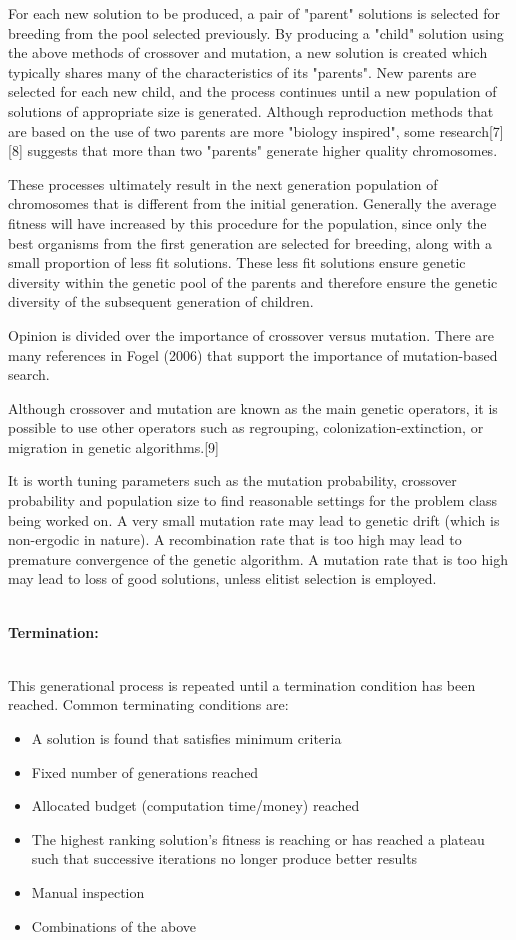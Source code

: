 \documentclass[a4paper, 12pt]{article}
\begin{document}
For each new solution to be produced, a pair of "parent" solutions is selected for breeding from the pool selected previously. By producing a "child" solution using the above methods of crossover and mutation, a new solution is created which typically shares many of the characteristics of its "parents". New parents are selected for each new child, and the process continues until a new population of solutions of appropriate size is generated. Although reproduction methods that are based on the use of two parents are more "biology inspired", some research[7][8] suggests that more than two "parents" generate higher quality chromosomes.

These processes ultimately result in the next generation population of chromosomes that is different from the initial generation. Generally the average fitness will have increased by this procedure for the population, since only the best organisms from the first generation are selected for breeding, along with a small proportion of less fit solutions. These less fit solutions ensure genetic diversity within the genetic pool of the parents and therefore ensure the genetic diversity of the subsequent generation of children.

Opinion is divided over the importance of crossover versus mutation. There are many references in Fogel (2006) that support the importance of mutation-based search.

Although crossover and mutation are known as the main genetic operators, it is possible to use other operators such as regrouping, colonization-extinction, or migration in genetic algorithms.[9]

It is worth tuning parameters such as the mutation probability, crossover probability and population size to find reasonable settings for the problem class being worked on. A very small mutation rate may lead to genetic drift (which is non-ergodic in nature). A recombination rate that is too high may lead to premature convergence of the genetic algorithm. A mutation rate that is too high may lead to loss of good solutions, unless elitist selection is employed.\\~\\
\begin{large}\textbf{Termination:}\end{large}\\
This generational process is repeated until a termination condition has been reached. Common terminating conditions are:
\begin{itemize}
\item A solution is found that satisfies minimum criteria
\item Fixed number of generations reached
\item Allocated budget (computation time/money) reached
\item The highest ranking solution's fitness is reaching or has reached a plateau such that successive iterations no longer produce better results
\item Manual inspection
\item Combinations of the above
\end{itemize}
\end{document}
